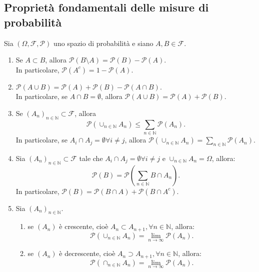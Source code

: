 \documentclass{article}
\begin{document}
\subsection{Proprietà fondamentali delle misure di probabilità}
Sia $(\Omega, \mathcal{F}, \mathcal{P})$ uno spazio di probabilità e siano $A,
B \in \mathcal{F}$.
\begin{enumerate}
	\item Se $A \subset B$, allora $\mathcal{P}(B \setminus A) = \mathcal{P}(B) -
			\mathcal{P}(A)$.\\
			In particolare, $\mathcal{P}(A^c) = 1 - \mathcal{P}(A)$.

	\item $\mathcal{P}(A \cup B) = \mathcal{P}(A) + \mathcal{P}(B) - 
		\mathcal{P}(A \cap B)$.\\
		In particolare, se $A \cap B = \emptyset$, allora $\mathcal{P}(A \cup B) =
		\mathcal{P}(A) + \mathcal{P}(B)$.

	\item Se $(A_n)_{n \in \mathbb{N}} \subset \mathcal{F}$, allora
		\begin{equation}
			\mathcal{P}(\cup_{n \in \mathbb{N}} A_n) \leq \sum_{n \in \mathbb{N}}
			\mathcal{P}(A_n).
		\end{equation}
		In particolare, se $A_i \cap A_j = \emptyset \forall i \neq j$, allora
		$\mathcal{P}(\cup_{n \in \mathbb{N}} A_n) = \sum_{n \in \mathbb{N}}
		\mathcal{P}(A_n)$.

	\item Sia $(A_n)_{n \in \mathbb{N}} \subset \mathcal{F}$ tale che $A_i \cap
		A_j = \emptyset \forall i \neq j$ e $\cup_{n \in \mathbb{N}} A_n =
		\Omega$, allora:
		\begin{equation}
			\mathcal{P}(B) = \mathcal{P}(\sum_{n \in \mathbb{N}} B \cap A_n).
		\end{equation}
		In particolare, $\mathcal{P}(B) = \mathcal{P}(B \cap A) + \mathcal{P}(B
		\cap A^c)$.

	\item Sia $(A_n)_{n \in \mathbb{N}}$.
		\begin{enumerate}
			\item se $(A_n)$ è crescente, cioè $A_n \subset A_{n+1}, \forall n
				\in \mathbb{N}$, allora:
				\begin{equation}
				\mathcal{P}(\cup_{n \in \mathbb{N}}
				A_n) = \lim_{n \to \infty} \mathcal{P}(A_n).
				\end{equation}

			\item se $(A_n)$ è decrescente, cioè $A_n \supset A_{n+1}, \forall n
				\in \mathbb{N}$, allora:
				\begin{equation}
				\mathcal{P}(\cap_{n \in \mathbb{N}} A_n) = \lim_{n \to \infty}
				\mathcal{P}(A_n).
				\end{equation}
		\end{enumerate}
\end{enumerate}
\end{document}
